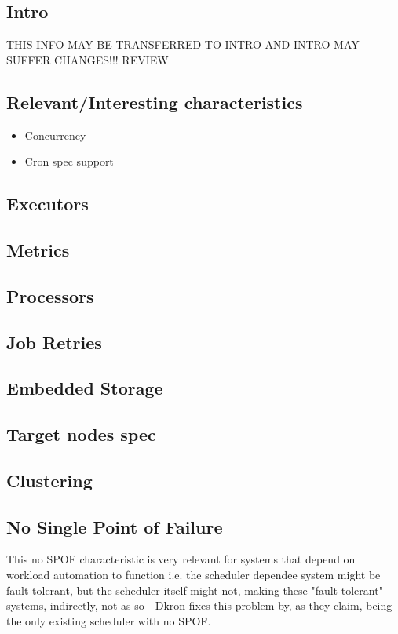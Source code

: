 \documentclass[runningheads]{llncs}
\begin{document}
\subsection{Intro}
THIS INFO MAY BE TRANSFERRED TO INTRO AND INTRO MAY SUFFER CHANGES!!! REVIEW

\subsection{Relevant/Interesting characteristics}
\begin{itemize}
    \item Concurrency
    \item Cron spec support
\end{itemize}

\subsection{Executors}

\subsection{Metrics}
\subsection{Processors}
\subsection{Job Retries}
\subsection{Embedded Storage}
\subsection{Target nodes spec}
\subsection{Clustering}
\label{clustering}






\subsection{No Single Point of Failure}
This no SPOF characteristic is very relevant for systems that depend on workload automation to function i.e. the scheduler dependee
system might be fault-tolerant, but the scheduler itself might not, making these "fault-tolerant" systems, indirectly, not as
so - Dkron fixes this problem by, as they claim, being the only existing scheduler with no SPOF. %
\end{document}
